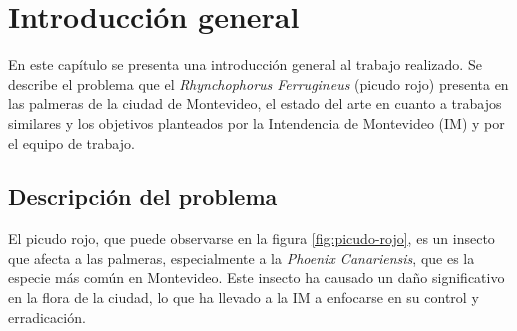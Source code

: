 
\chapter{Introducción general} %

\label{Chapter1} %
\label{IntroGeneral}

En este capítulo se presenta una introducción general al trabajo realizado. Se describe el problema que el \textit{Rhynchophorus Ferrugineus} (picudo rojo) presenta en las palmeras de la ciudad de Montevideo, el estado del arte en cuanto a trabajos similares y los objetivos planteados por la Intendencia de Montevideo (IM) y por el equipo de trabajo.


\newcommand{\keyword}[1]{\textbf{#1}}
\newcommand{\tabhead}[1]{\textbf{#1}}
\newcommand{\code}[1]{\texttt{#1}}
\newcommand{\file}[1]{\texttt{\bfseries#1}}
\newcommand{\option}[1]{\texttt{\itshape#1}}
\newcommand{\grados}{$^{\circ}$}
\newcommand{\comment}[1]{}

\section{Descripción del problema}
\label{sec:descProblema}

El picudo rojo, que puede observarse en la figura \ref{fig:picudo-rojo}, es un insecto que afecta a las palmeras, especialmente a la \textit{Phoenix Canariensis}, que es la especie más común en Montevideo. Este insecto ha causado un daño significativo en la flora de la ciudad, lo que ha llevado a la IM a enfocarse en su control y erradicación.

